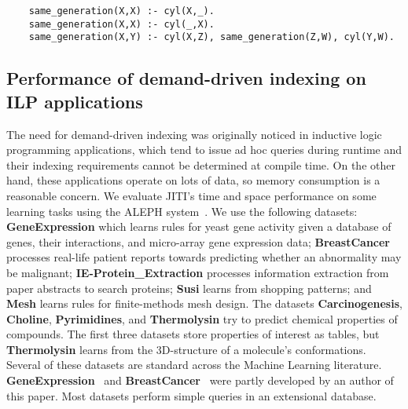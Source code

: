 \documentclass{llncs}
\newcommand{\JITI}{demand-driven indexing\xspace}
\newcommand{\bench}[1]{\textbf{\textsf{#1}}}
\newcommand{\BreastCancer}{\bench{BreastCancer}\xspace}
\newcommand{\Carcino}{\bench{Carcinogenesis}\xspace}
\newcommand{\Choline}{\bench{Choline}\xspace}
\newcommand{\GeneExpr}{\bench{GeneExpression}\xspace}
\newcommand{\IEProtein}{\bench{IE-Protein\_Extraction}\xspace}
\newcommand{\Mesh}{\bench{Mesh}\xspace}
\newcommand{\Pyrimidines}{\bench{Pyrimidines}\xspace}
\newcommand{\Susi}{\bench{Susi}\xspace}
\newcommand{\Thermolysin}{\bench{Thermolysin}\xspace}
\begin{document}
\begin{small}
  \begin{verbatim}
    same_generation(X,X) :- cyl(X,_).
    same_generation(X,X) :- cyl(_,X).
    same_generation(X,Y) :- cyl(X,Z), same_generation(Z,W), cyl(Y,W).
  \end{verbatim}
\end{small}


\subsection{Performance of \JITI on ILP applications} \label{sec:perf:ILP}
The need for \JITI was originally noticed in inductive logic
programming applications, which tend to issue ad hoc queries during
runtime and their indexing requirements cannot be determined at
compile time. On the other hand, these applications operate on lots of
data, so memory consumption is a reasonable concern. We evaluate
JITI's time and space performance on some learning tasks using the
ALEPH system~\cite{ALEPH}. We use the following datasets:
%
\GeneExpr which learns rules for
yeast gene activity given a database of genes, their interactions, and
micro-array gene expression data; \BreastCancer processes real-life
patient reports towards predicting whether an abnormality may be
malignant; \IEProtein processes information extraction from paper
abstracts to search proteins; \Susi learns from shopping patterns; and
\Mesh learns rules for finite-methods mesh design. The datasets
\Carcino, \Choline, \Pyrimidines, and
\Thermolysin try to predict chemical properties of compounds. The
first three datasets store properties of interest as tables, but
\Thermolysin learns from the 3D-structure of a molecule's
conformations. Several of these datasets are standard across the
Machine Learning literature. \GeneExpr~\cite{ilp-regulatory06}
and \BreastCancer~\cite{DBLP:conf/ijcai/DavisBDPRCS05} were partly
developed by an author of this paper. Most datasets perform simple
queries in an extensional database.
\end{document}
